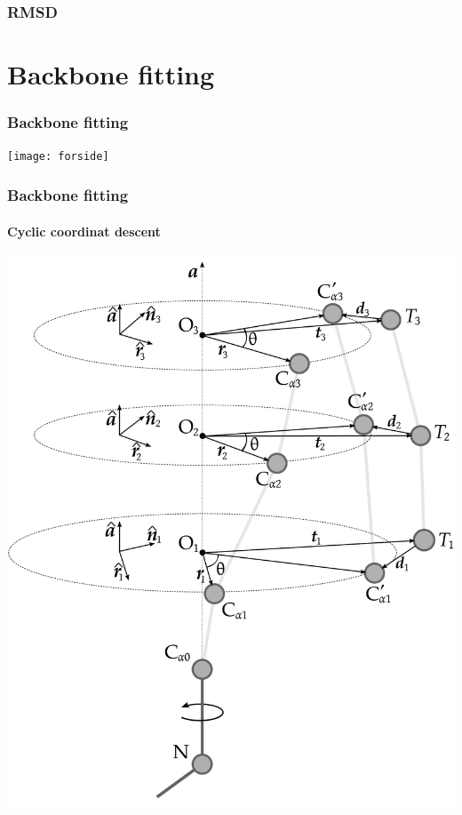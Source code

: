 \documentclass{beamer}
\begin{document}
\begin{frame}[t, fragile]
  \frametitle{RMSD}
  
\end{frame}

\section{Backbone fitting}
\begin{frame}[t, fragile]
  \frametitle{Backbone fitting} 
\begin{center}
	\texttt{[image: forside]}
\end{center}
\end{frame}

\begin{frame}[t, fragile]
\frametitle{Backbone fitting} 
\framesubtitle{Cyclic coordinat descent}
\begin{center}
	\includegraphics[width=.45\textwidth]{ccd}
\end{center}
\end{frame}
\end{document}
